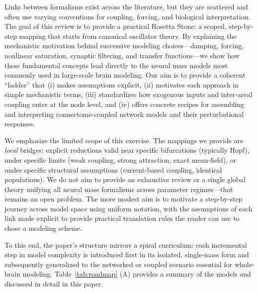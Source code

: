 \documentclass[12pt]{article}
\numberwithin{equation}{section}
\newcommand{\rev}[1]{\begingroup\color{navyblue}#1\endgroup}
\begin{document}
\rev{Links between formalisms exist across the literature, but they are scattered and often use varying conventions for coupling, forcing, and biological interpretation. The goal of this review is to provide a practical Rosetta Stone: a scoped, step-by-step mapping that starts from canonical oscillator theory. By explaining the mechanistic motivation behind successive modeling choices—damping, forcing, nonlinear saturation, synaptic filtering, and transfer functions—we show how these fundamental concepts lead directly to the neural mass models most commonly used in large-scale brain modeling. Our aim is to provide a coherent “ladder” that (i) makes assumptions explicit, (ii) motivates each approach in simple mechanistic terms, (iii) standardizes how exogenous inputs and inter-areal coupling enter at the node level, and (iv) offers concrete recipes for assembling and interpreting connectome-coupled network models and their perturbational responses.

We emphasize the limited scope of this exercise. The mappings we provide are \emph{local} bridges: explicit reductions valid near specific bifurcations (typically Hopf), under specific limits (weak coupling, strong attraction, exact mean-field), or under specific structural assumptions (current-based coupling, identical populations). We do not aim to provide an exhaustive review or a single global theory unifying all neural mass formalisms across  parameter regimes—that remains an open problem. The more modest aim is to motivate a step-by-step journey across model space using uniform notation, with the assumptions of each link made explicit to provide practical translation rules the reader can use to chose a modeling scheme.}

 To this end, the paper's structure mirrors a spiral curriculum: each incremental step in model complexity is introduced first in its isolated, single-mass form and subsequently generalized to the networked or coupled scenario essential for whole-brain modeling. Table~\ref{tab:roadmap} (A) provides a summary of the models and discussed in detail in this paper. 
\end{document}

